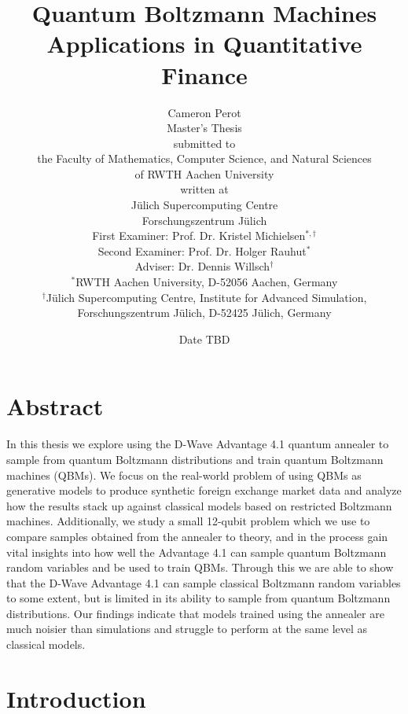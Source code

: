 \documentclass[11pt,twoside]{report}
\title{
    {Quantum Boltzmann Machines}\\
    {\large Applications in Quantitative Finance}
}
\author{
    {\LARGE Cameron Perot\vspace{1cm}}\\
    {Master's Thesis\vspace{0.1cm}}\\
    {\small submitted to\vspace{0.1cm}}\\
    {the Faculty of Mathematics, Computer Science, and Natural Sciences}\\
    {of RWTH Aachen University\vspace{0.1cm}}\\
    {\small written at\vspace{0.1cm}}\\
    {Jülich Supercomputing Centre}\\
    {Forschungszentrum Jülich\vspace{1cm}}\\
    {First Examiner: Prof. Dr. Kristel Michielsen\( ^{*,\dag} \)}\\
    {Second Examiner: Prof. Dr. Holger Rauhut\( ^* \)}\\
    {Adviser: Dr. Dennis Willsch\( ^\dag \)\vspace{0.1cm}}\\
    {\footnotesize\( ^* \)RWTH Aachen University, D-52056 Aachen, Germany}\\
    {\footnotesize\( ^\dag \)Jülich Supercomputing Centre, Institute for Advanced Simulation,}\\
    {\footnotesize Forschungszentrum Jülich, D-52425 Jülich, Germany\vspace{0.5cm}}
}
\date{Date TBD}
\begin{document}
\maketitle
{}

\clearpage\shipout\null
\chapter*{Abstract}

In this thesis we explore using the D-Wave Advantage 4.1 quantum annealer to sample from quantum Boltzmann distributions and train quantum Boltzmann machines (QBMs).
We focus on the real-world problem of using QBMs as generative models to produce synthetic foreign exchange market data and analyze how the results stack up against classical models based on restricted Boltzmann machines.
Additionally, we study a small 12-qubit problem which we use to compare samples obtained from the annealer to theory, and in the process gain vital insights into how well the Advantage 4.1 can sample quantum Boltzmann random variables and be used to train QBMs.
Through this we are able to show that the D-Wave Advantage 4.1 can sample classical Boltzmann random variables to some extent, but is limited in its ability to sample from quantum Boltzmann distributions.
Our findings indicate that models trained using the annealer are much noisier than simulations and struggle to perform at the same level as classical models.

\clearpage\shipout\null

\tableofcontents
\clearpage\shipout\null

\chapter{Introduction}
\label{ch:introduction}


\end{document}
